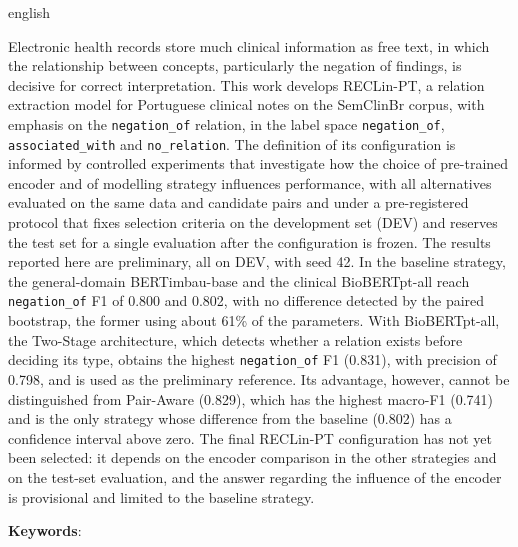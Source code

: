 \begin{resumo}[Abstract]
  \vspace{-15pt}

  \begin{otherlanguage*}{english}

  Electronic health records store much clinical information as free text, in which
  the relationship between concepts, particularly the negation of findings, is
  decisive for correct interpretation. This work develops RECLin-PT, a relation
  extraction model for Portuguese clinical notes on the SemClinBr corpus, with emphasis
  on the \texttt{negation\_of} relation, in the label space \texttt{negation\_of},
  \texttt{associated\_with} and \texttt{no\_relation}. The definition of its
  configuration is informed by controlled experiments that investigate how the
  choice of pre-trained encoder and of modelling strategy influences performance,
  with all alternatives evaluated on the
  same data and candidate pairs and under a pre-registered protocol that fixes
  selection criteria on the development set (DEV) and reserves the test set for a
  single evaluation after the configuration is frozen. The results reported here are
  preliminary, all on DEV, with seed 42. In the baseline strategy, the general-domain
  BERTimbau-base and the clinical BioBERTpt-all reach \texttt{negation\_of} F1 of
  0.800 and 0.802, with no difference detected by the paired bootstrap, the former
  using about 61\% of the parameters. With BioBERTpt-all, the Two-Stage architecture,
  which detects whether a relation exists before deciding its type, obtains the
  highest \texttt{negation\_of} F1 (0.831), with precision of 0.798, and is used as
  the preliminary reference. Its advantage, however, cannot be distinguished from
  Pair-Aware (0.829), which has the highest macro-F1 (0.741) and is the only strategy
  whose difference from the baseline (0.802) has a confidence interval above zero. The
  final RECLin-PT configuration has not yet been selected: it depends on the encoder
  comparison in the other strategies and on the test-set evaluation, and the answer
  regarding the influence of the encoder is provisional and limited to the baseline
  strategy.

  \vspace{\onelineskip}

  \noindent\textbf{Keywords}: \inlinekeywords
\end{otherlanguage*}
\end{resumo}
